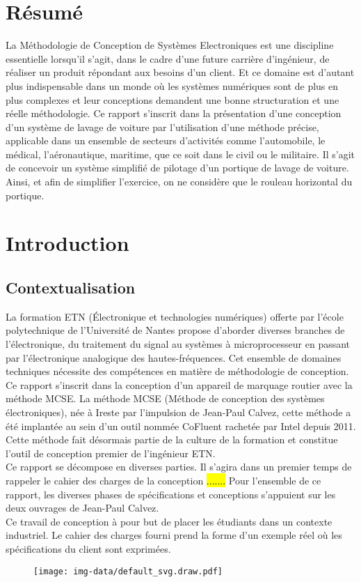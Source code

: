 \vspace*{4cm}
\section*{Résumé}
La Méthodologie de Conception de Systèmes Electroniques est une discipline essentielle lorsqu'il s'agit, dans le cadre d'une future carrière d'ingénieur, de réaliser un produit répondant aux besoins d'un client.
Et ce domaine est d'autant plus indispensable dans un monde où les systèmes numériques sont de plus en plus complexes et leur conceptions demandent une bonne structuration et une réelle méthodologie.
Ce rapport s'inscrit dans la présentation d'une conception d'un système de lavage de voiture par l'utilisation d'une méthode précise, applicable dans un ensemble de secteurs d'activités comme l'automobile, le médical, l'aéronautique, maritime, que ce soit dans le civil ou le militaire.
Il s'agit de concevoir un système simplifié de pilotage d'un portique de lavage de voiture.
Ainsi, et afin de simplifier l'exercice, on ne considère que le rouleau horizontal du portique.

\newpage

\section{Introduction}

\subsection{Contextualisation}
La formation ETN (Électronique et technologies numériques) offerte par l'école polytechnique de l'Université de Nantes propose d'aborder diverses branches de l'électronique, du traitement du signal au systèmes à microprocesseur en passant par l'électronique analogique des hautes-fréquences.
Cet ensemble de domaines techniques nécessite des compétences en matière de méthodologie de conception. Ce rapport s'inscrit dans la conception d'un appareil de marquage routier avec la méthode MCSE.
La méthode MCSE (Méthode de conception des systèmes électroniques), née à Ireste par l'impulsion de Jean-Paul Calvez, cette méthode a été implantée au sein d'un outil nommée CoFluent rachetée par Intel\mbox{\textregistered } depuis 2011. Cette méthode fait désormais partie de la culture de la formation et constitue l'outil de conception premier de l'ingénieur ETN.\\
Ce rapport se décompose en diverses parties.
Il s'agira dans un premier temps de rappeler le cahier des charges de la conception \hl{.......} %
Pour l'ensemble de ce rapport, les diverses phases de spécifications et conceptions s'appuient sur les deux ouvrages de Jean-Paul Calvez. \cite{Calvez_1} \cite{Calvez_2} \\
Ce travail de conception à pour but de placer les étudiants dans un contexte industriel. Le cahier des charges fourni prend la forme d'un exemple réel où les spécifications du client sont exprimées.


\begin{figure}
    \centering
    \texttt{[image: img-data/default\_svg.draw.pdf]}
\end{figure}

